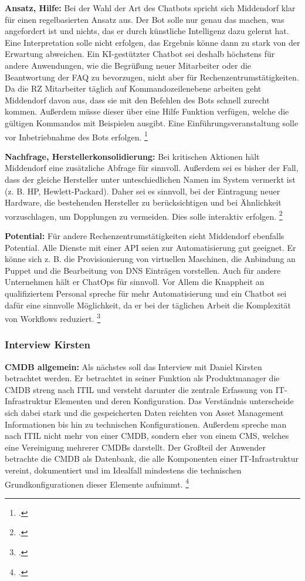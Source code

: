 \textbf{Ansatz, Hilfe: }Bei der Wahl der Art des Chatbots spricht sich Middendorf klar für einen regelbasierten Ansatz aus. Der Bot solle nur genau das machen, was angefordert ist und nichts, das er durch künstliche Intelligenz dazu gelernt hat. Eine Interpretation solle nicht erfolgen, das Ergebnis könne dann zu stark von der Erwartung abweichen. Ein KI-gestützter Chatbot sei deshalb höchstens für andere Anwendungen, wie die Begrüßung neuer Mitarbeiter oder die Beantwortung der FAQ zu bevorzugen, nicht aber für Rechenzentrumstätigkeiten.\\
Da die RZ Mitarbeiter täglich auf Kommandozeilenebene arbeiten geht Middendorf davon aus, dass sie mit den Befehlen des Bots schnell zurecht kommen. Außerdem müsse dieser über eine Hilfe Funktion verfügen, welche die gültigen Kommandos mit Beispielen ausgibt.  Eine Einführungsveranstaltung solle vor Inbetriebnahme des Bots erfolgen.
\footcite[Vgl.][o. \pno]{Midd_2019}

\textbf{Nachfrage, Herstellerkonsolidierung: }Bei kritischen Aktionen hält Middendorf eine zusätzliche Abfrage für sinnvoll. Außerdem sei es bisher der Fall, dass der gleiche Hersteller unter unteschiedlichen Namen im System vermerkt ist (z. B. HP, Hewlett-Packard). Daher sei es sinnvoll, bei der Eintragung neuer Hardware, die bestehenden Hersteller zu berücksichtigen und bei Ähnlichkeit vorzuschlagen, um Dopplungen zu vermeiden. Dies solle interaktiv erfolgen.
\footcite[Vgl.][o. \pno]{Midd_2019}

\textbf{Potential: }Für andere Rechenzentrumstätigkeiten sieht Middendorf ebenfalls Potential. Alle Dienste mit einer API seien zur Automatisierung gut geeignet. Er könne sich z. B. die Provisionierung von virtuellen Maschinen, die Anbindung an Puppet und die Bearbeitung von DNS Einträgen vorstellen. Auch für andere Unternehmen hält er ChatOps für sinnvoll. Vor Allem die Knappheit an qualifiziertem Personal spreche für mehr Automatisierung und ein Chatbot sei dafür eine sinnvolle Möglichkeit, da er bei der täglichen Arbeit die Komplexität von Workflows reduziert.
\footcite[Vgl.][o. \pno]{Midd_2019}



\subsubsection{Interview Kirsten}
\textbf{CMDB allgemein: }Als nächstes soll das Interview mit Daniel Kirsten betrachtet werden. Er betrachtet in seiner Funktion als Produktmanager die \acs{CMDB} streng nach \acs{ITIL} und versteht darunter die zentrale Erfassung von IT-Infrastruktur Elementen und deren Konfiguration. Das Verständnis unterscheide sich dabei stark und die gespeicherten Daten reichten von Asset Management Informationen bis hin zu technischen Konfigurationen. Außerdem spreche man nach \acs{ITIL} nicht mehr von einer \acs{CMDB}, sondern eher von einem \acf{CMS}, welches eine Vereinigung mehrerer \acsp{CMDB} darstellt. Der Großteil der Anwender betrachte die \acs{CMDB} als Datenbank, die \glqq{}alle Komponenten einer IT-Infrastruktur vereint, dokumentiert und im Idealfall mindestens die technischen Grundkonfigurationen dieser Elemente aufnimmt.\grqq 
\footcites[][o. \pno]{Kirsten_2019}[Vgl.][o. \pno]{Kirsten_2019}

